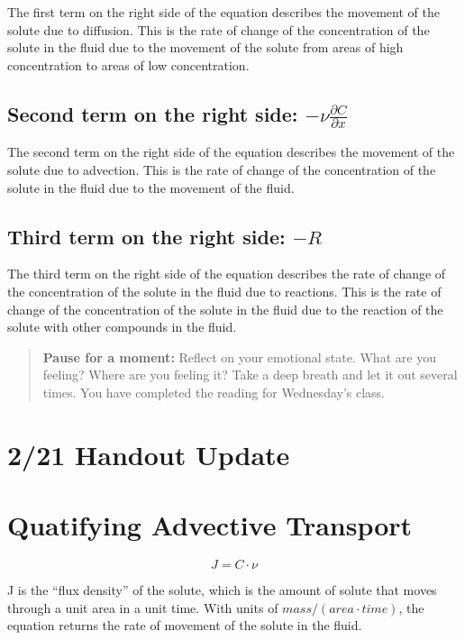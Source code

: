 \documentclass{tufte-handout}\usepackage[]{graphicx}\usepackage[]{xcolor}
\begin{document}
The first term on the right side of the equation describes the movement of the solute due to diffusion. This is the rate of change of the concentration of the solute in the fluid due to the movement of the solute from areas of high concentration to areas of low concentration.

\subsection{Second term on the right side: $- \nu \frac{\partial C}{\partial x}$}

The second term on the right side of the equation describes the movement of the solute due to advection. This is the rate of change of the concentration of the solute in the fluid due to the movement of the fluid.

\subsection{Third term on the right side: $- R$}

The third term on the right side of the equation describes the rate of change of the concentration of the solute in the fluid due to reactions. This is the rate of change of the concentration of the solute in the fluid due to the reaction of the solute with other compounds in the fluid.

\begin{quote}
\textbf{Pause for a moment:} Reflect on your emotional state. What are you feeling? Where are you feeling it? Take a deep breath and let it out several times. You have completed the reading for Wednesday's class. 
\end{quote}

\section{2/21 Handout Update}



\section{Quatifying Advective Transport}

\begin{equation}
  J = C \cdot \nu
\end{equation}

J is the ``flux density'' of the solute, which is the amount of solute that moves through a unit area in a unit time. With units of $mass / (area \cdot time)$, the equation returns the rate of movement of the solute in the fluid.
\end{document}
